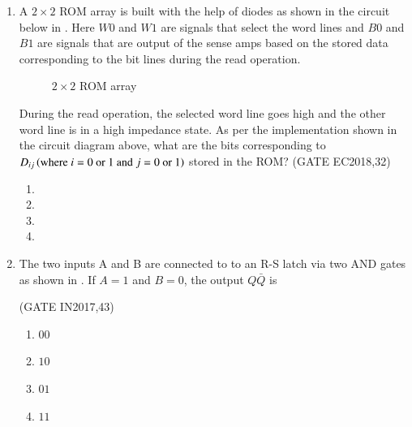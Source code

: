\begin{enumerate}[label=\arabic*.,ref=\theenumi]
\item  A $2\times2$ ROM array is built with the help of diodes as shown in the circuit below
	in . Here $W0$ and $W1$ are signals that select the word lines and $B0$ and $B1$ are signals that are output of the sense amps based on the stored data corresponding to the bit lines during the read operation.
%
\begin{figure}[!ht]
        \centering
	\resizebox{\columnwidth}{!}{%
        
	}
        \caption{ $2\times 2$ ROM array}
	\label{fig:2rom}
\end{figure}
%
		During the read operation, the selected word line goes high and the other word line is in a high impedance state. As per the implementation shown in the circuit diagram above, what are the bits corresponding to $D_{ij}\left(\text{where $i=0$ or $1$ and $j=0$ or $1$}\right)$ stored in the ROM?
	\hfill(GATE EC2018,32)
\begin{enumerate}
    \item {}
    \item {}
    \item {}    
    \item {}
\end{enumerate}

\item The two inputs A and B are connected to to an R-S latch via two AND gates as shown in  
       .
If $A=1$ and $B=0$, the output $Q\bar{Q}$ is
    \begin{figure}[!ht]
        \centering
	\resizebox{\columnwidth}{!}{%
        
	    }
	    \caption{}
       \label{fig:GATE IN2017,43}
       \end{figure}
       \hfill(GATE IN2017,43)
    \begin{enumerate}
   		\item $00$ 
   		\item $10$ 
   		\item $01$ 
   		\item $11$ 
   

\end{enumerate}
\end{enumerate}

